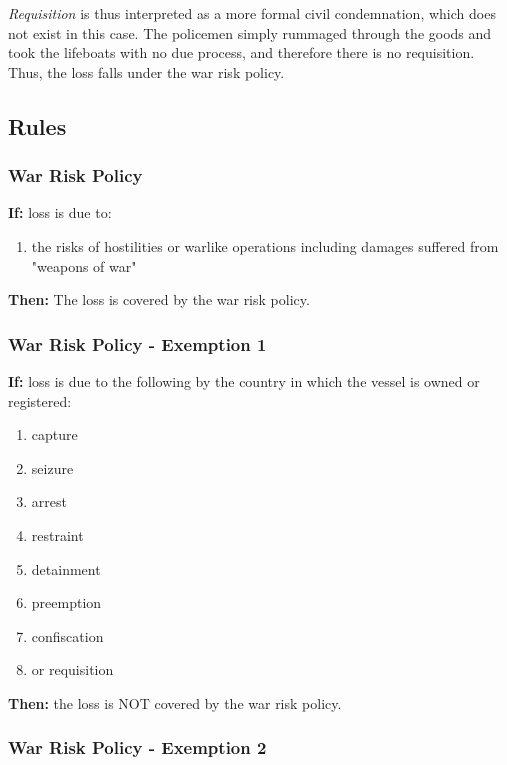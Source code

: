      \textit{Requisition} is thus interpreted as a more formal civil condemnation, which does not exist in this case. The policemen simply rummaged through the goods and took the lifeboats with no due process, and therefore there is no requisition. Thus, the loss falls under the war risk policy.
     
\subsection{Rules}

\subsubsection{War Risk Policy} 

    \textbf{If:} loss is due to:
    
    \begin{enumerate}
         \item the risks of hostilities or warlike operations including damages suffered from "weapons of war"
    \end{enumerate}
    
    
    \textbf{Then:} The loss is covered by the war risk policy.
        
\subsubsection{War Risk Policy - Exemption 1}

    \textbf{If:} loss is due to the following by the country in which the vessel is owned or registered: 
    \begin{enumerate}
        \item capture
        \item seizure
        \item arrest
        \item restraint 
        \item detainment
        \item preemption
        \item confiscation
        \item or requisition
    \end{enumerate}
    
    \textbf{Then:} the loss is NOT covered by the war risk policy.

\subsubsection{War Risk Policy - Exemption 2}

